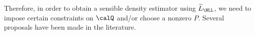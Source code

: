 \documentclass[12pt]{article}
\theoremstyle{definition}
\theoremstyle{theorem}
\theoremstyle{remark}
\begin{document}
Therefore, in order to obtain a sensible density estimator using $\widehat{L}_{\NLL}$, we need to impose certain constraints on $\calQ$ and/or choose a nonzero $P$. Several proposals have been made in the literature. 
%
%
%
%
%
\end{document}
